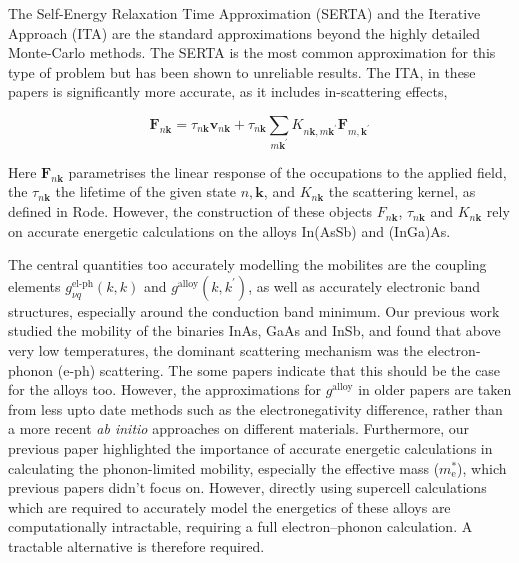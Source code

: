 \documentclass[aps,prmaterials,reprint,amsmath,amssymb,superscriptaddress]{revtex4-2}
\begin{document}
The Self-Energy Relaxation Time Approximation (SERTA) and the Iterative Approach (ITA)\cite{Rode1975} are the standard approximations beyond the highly detailed Monte-Carlo methods. 
The SERTA is the most common approximation for this type of problem\cite{MurphyArmando2008,Chin1991} but has been shown to unreliable results\cite{Ponce2021,Ponce2020,Claes2022,Ma2018}. The ITA, in these papers is significantly more accurate, as it includes in-scattering effects, 

\begin{equation}
\bm{F}_{n\bm{k}}=\tau_{n\bm{k}} \bm{v}_{n\bm{k}}+\tau_{n\bm{k}} \sum_{m\bm{k}^\prime} K_{n\bm{k},m\bm{k}^\prime}\bm{F}_{m,\bm{k}^\prime}\label{eq:ITA1}
\end{equation}

Here $\bm{F}_{n\bm{k}}$ parametrises the linear response of the occupations to the applied field, the $\tau_{n\bm{k}}$ the lifetime of the given state $n,\bm{k}$, and $K_{n\bm{k}}$ the scattering kernel, as defined in Rode\cite{Rode1975}. However, the construction of these objects $F_{n\bm{k}}$, $\tau_{n\bm{k}}$ and $K_{n\bm{k}}$ rely on accurate energetic calculations on the alloys In(AsSb) and (InGa)As. 

The central quantities too accurately modelling the mobilites are the coupling elements $g^\text{el-ph}_{\nu q}(k,k)$ and $g^\text{alloy}(k,k^\prime)$, as well as accurately electronic band structures, especially around the conduction band minimum\cite{Dehghani2026}. Our previous work studied the mobility of the binaries InAs, GaAs and InSb, and found that above very low temperatures, the dominant scattering mechanism was the electron-phonon (e-ph) scattering. The some papers indicate that this should be the case for the alloys too\cite{Chin1991,Rode1983}. However, the approximations for $g^\text{alloy}$ in older papers are taken from less upto date methods such as the electronegativity difference\cite{Phillips1970}, rather than a more recent \textit{ab initio} approaches on different materials\cite{MurphyArmando2006,MurphyArmando2008}. Furthermore, our previous paper highlighted the importance of accurate energetic calculations in calculating the phonon-limited mobility, especially the effective mass ($m^*_\text{e}$), which previous papers didn't focus on\cite{Harrison1976,Rode1983,Chin1991}. However, directly using supercell calculations which are required to accurately model the energetics of these alloys\cite{Gentles2026a} are computationally intractable, requiring a full electron--phonon calculation. A tractable alternative is therefore required.
\end{document}
